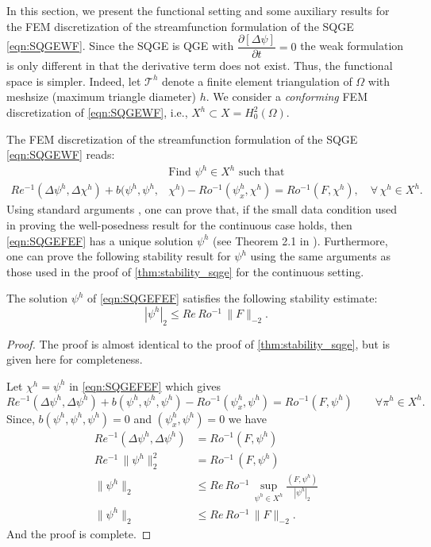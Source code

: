 In this section, we present the functional setting and some auxiliary results
for the FEM discretization of the streamfunction formulation of the SQGE
\eqref{eqn:SQGEWF}. Since the SQGE is QGE with $\dfrac{\partial [\Delta
\psi]}{\partial t} = 0$ the weak formulation is only different in that the
derivative term does not exist. Thus, the functional space is simpler. Indeed,
let $\mathcal{T}^h$ denote a finite element triangulation of $\Omega$ with
meshsize (maximum triangle diameter) $h$. We consider a \emph{conforming} FEM
discretization of \eqref{eqn:SQGEWF}, i.e., $X^h \subset X = H_0^2(\Omega)$.

The FEM discretization of the streamfunction formulation of the SQGE
\eqref{eqn:SQGEWF} reads:
\begin{equation}
  \begin{split}
    &\text{Find } \psi^h \in X^h \text{ such that} \\
    Re^{-1}(\Delta \psi^h, \Delta \chi^h)
      + b(\psi^h,\psi^h,&\chi^h)
      - Ro^{-1} (\psi_x^h,\chi^h)
      = Ro^{-1}(F,\chi^h),\quad \forall \, \chi^h \in X^h.
    \label{eqn:SQGEFEF}
  \end{split}
\end{equation}
Using standard arguments \cite{Girault79,Girault86}, one can prove that, if the
small data condition used in proving the well-posedness result for the
continuous case holds, then \eqref{eqn:SQGEFEF} has a unique solution $\psi^h$
(see Theorem 2.1 in \cite{Cayco86}). Furthermore, one can prove the following
stability result for $\psi^h$ using the same arguments as those used in the
proof of \eqref{thm:stability_sqge} for the continuous setting.
\begin{thm} \label{thm:stability_fem_sqge} The
  solution $\psi^h$ of \eqref{eqn:SQGEFEF} satisfies the following stability estimate:
 \begin{equation}
   |\psi^h|_2 \le Re \, Ro^{-1} \, \| F \|_{-2} .
   \label{eqn:stability_fem_sqge}
 \end{equation}
\end{thm}
\begin{proof}
  The proof is almost identical to the proof of \autoref{thm:stability_sqge}, but is given here for
  completeness.

  Let $\chi^h = \psi^h$ in \eqref{eqn:SQGEFEF} which gives
  \begin{equation*}
    Re^{-1}(\Delta \psi^h, \Delta \psi^h)
      + b(\psi^h,\psi^h,\psi^h)
      - Ro^{-1} (\psi_x^h,\psi^h)
      = Ro^{-1} (F,\psi^h)\qquad  \forall \pi^h \in X^h.
  \end{equation*}
  Since, $b(\psi^h, \psi^h, \psi^h) =0$ and $(\psi_x^h,\psi^h)=0$ we have
  \begin{align*}
    Re^{-1}(\Delta \psi^h, \Delta \psi^h) &= Ro^{-1} (F,\psi^h) \\
    Re^{-1}\, \|\psi^h\|_2^2 &= Ro^{-1}\, (F,\psi^h) \\
    \|\psi^h\|_2 &\le Re\, Ro^{-1}\,\sup_{\psi^h \in X^h} \frac{(F,\psi^h)}{|\psi^h|_2} \\
    \|\psi^h\|_2 &\le Re\, Ro^{-1}\, \|F\|_{-2}.
  \end{align*}
  And the proof is complete.
\end{proof}

